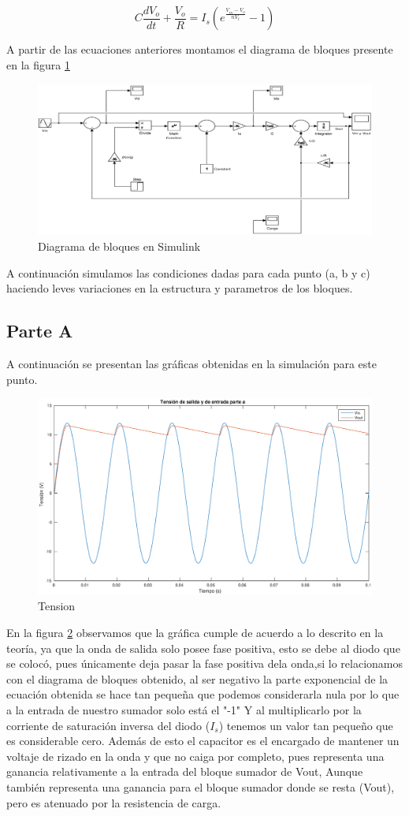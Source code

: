 \documentclass[12pt,letterpaper]{article}
\begin{document}
\begin{equation}
C \frac{dV_o}{dt} + \frac{V_o}{R} = I_s\left(e^{\frac{V_{in}-V_{o}}{nV_t}}-1\right)
\end{equation}

A partir de las ecuaciones anteriores montamos el diagrama de bloques presente en la figura \ref{fig:diag_bloques_2}


\begin{figure}[ht!]
  \centering
  \includegraphics[width=0.5\linewidth]{pictures/Ejercicio2_Diagrama_Bloques.eps}
  \caption{Diagrama de bloques en Simulink}
  \label{fig:diag_bloques_2}
\end{figure}

A continuación simulamos las condiciones dadas para cada punto (a, b y c) haciendo leves variaciones en la estructura y parametros de los bloques.

\subsection{Parte A}
A continuación se presentan las gráficas obtenidas en la simulación para este punto. 

\begin{figure}[ht!]
  \centering
  \includegraphics[width=0.5\linewidth]{pictures/Ejercicio2_a_Vin_Vout.eps}
  \caption{Tension }
  \label{fig:2_a_Vin_Vout}
\end{figure}

En la figura \ref{fig:2_a_Vin_Vout} observamos que la gráfica cumple de acuerdo a lo descrito en la teoría, ya que la onda de salida solo posee fase positiva, esto se debe al diodo que se colocó, pues únicamente deja pasar la fase positiva dela onda,si lo relacionamos con el diagrama de bloques obtenido, al ser negativo la parte exponencial de la ecuación obtenida  se hace tan pequeña que podemos considerarla nula por lo que a la entrada de nuestro sumador solo está el "-1" Y al multiplicarlo por la corriente de saturación inversa del diodo ($I_s$) tenemos un valor tan pequeño que es considerable cero. Además de esto el capacitor es el encargado de mantener un voltaje de rizado en la onda y que no caiga por completo, pues representa una ganancia relativamente a la entrada del bloque sumador de Vout, Aunque también representa una ganancia para el bloque sumador donde se resta (Vout), pero es atenuado por la resistencia de carga.
\end{document}
